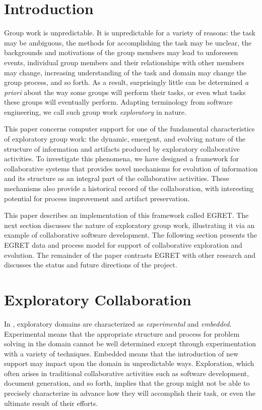 \section{Introduction}

Group work is unpredictable. It is unpredictable for a variety of reasons: the task may be ambiguous, the methods for accomplishing the task may be unclear, the backgrounds and motivations of the group members may lead to unforeseen events, individual group members and their relationships with other members may change, increasing understanding of the task and domain may change the group process, and so forth.  As a result, surprisingly little can be determined {\em a priori}\/ about the way some groups will perform their tasks, or even what tasks these groups will eventually perform.  Adapting terminology from software engineering, we call such group work {\em exploratory}\/ in nature.

This paper concerns computer support for one of the fundamental characteristics of exploratory group work: the dynamic, emergent, and evolving nature of the structure of information and artifacts produced by exploratory collaborative activities.  To investigate this phenomena, we have designed a framework for collaborative systems that provides novel mechanisms for evolution of information and its structure as an integral part of the collaborative activities.  These mechanisms also provide a historical record of the collaboration, with interesting potential for process improvement and artifact preservation.

This paper describes an implementation of this framework called EGRET.  The next section discusses the nature of exploratory group work, illustrating it via an example of collaborative software development.  The following section presents the EGRET data and process model for support of collaborative exploration and evolution. The remainder of the paper contrasts EGRET with other research and discusses the status and future directions of the project.

\section{Exploratory Collaboration}

In \cite{Giddings84}, exploratory domains are characterized as {\em experimental} and {\em embedded}. Experimental means that the appropriate structure and process for problem solving in the domain cannot be well determined except through experimentation with a variety of techniques.  Embedded means that the introduction of new support may impact upon the domain in unpredictable ways.  Exploration, which often arises in traditional collaborative activities such as software development, document generation, and so forth, implies that the group might not be able to precisely characterize in advance how they will accomplish their task, or even the ultimate result of their efforts.

